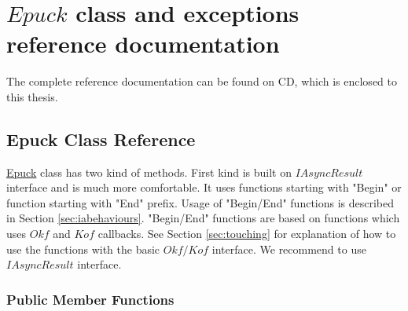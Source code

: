 \chapter{$Epuck$ class and exceptions reference documentation} \label{app:epuckref}
\begin{remark}
The complete reference documentation can be found on CD, which is enclosed
to this thesis.
\end{remark}

\hypertarget{class_elib_1_1_epuck}{
\section{Epuck Class Reference}
\label{class_elib_1_1_epuck}
}

\hyperlink{class_elib_1_1_epuck}{Epuck} class has two kind of methods.
First kind is built on $IAsyncResult$ interface and is much more comfortable.
It uses functions starting with "Begin" or function starting with "End" prefix.
Usage of "Begin/End" functions is described in Section \ref{sec:iabehaviours}.
"Begin/End" functions are based on functions which uses $Okf$ and $Kof$ callbacks.
See Section \ref{sec:touching} for explanation of how to use the functions with
the basic $Okf/Kof$ interface.
We recommend to use $IAsyncResult$ interface.

\subsection*{Public Member Functions}

